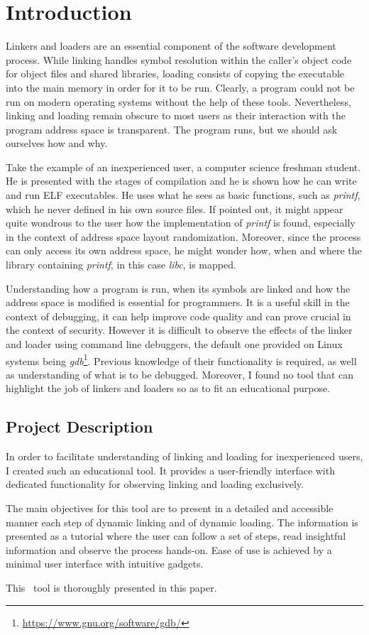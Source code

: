\chapter{Introduction}
\label{chapter:intro}

Linkers and loaders are an essential component of the software development process. While linking handles symbol resolution within the caller’s object code for object files and shared libraries, loading consists of copying the executable into the main memory in order for it to be run. Clearly, a program could not be run on modern operating systems without the help of these tools. Nevertheless, linking and loading remain obscure to most users as their interaction with the program address space is transparent. The program runs, but we should ask ourselves how and why.

Take the example of an inexperienced user, a computer science freshman student. He is presented with the stages of compilation and he is shown how he can write and run ELF executables. He uses what he sees as basic functions, such as \textit{printf}, which he never defined in his own source files. If pointed out, it might appear quite wondrous to the user how the implementation of \textit{printf} is found, especially in the context of address space layout randomization. Moreover, since the process can only access its own address space, he might wonder how, when and where the library containing \textit{printf}, in this case \textit{libc}, is mapped.

Understanding how a program is run, when its symbols are linked and how the address space is modified is essential for programmers. It is a useful skill in the context of debugging, it can help improve code quality and can prove crucial in the context of security. However it is difficult to observe the effects of the linker and loader using command line debuggers, the default one provided on Linux systems being \textit{gdb}\footnote{\url{https://www.gnu.org/software/gdb/}}. Previous knowledge of their functionality is required, as well as understanding of what is to be debugged. Moreover, I found no tool that can highlight the job of linkers and loaders so as to fit an educational purpose.

\section{Project Description}
\label{sec:proj}

In order to facilitate understanding of linking and loading for inexperienced users, I created such an educational tool. It provides a user-friendly interface with dedicated functionality for observing linking and loading exclusively.

The main objectives for this tool are to present in a detailed and accessible manner each step of dynamic linking and of dynamic loading. The information is presented as a tutorial where the user can follow a set of steps, read insightful information and observe the process hands-on. Ease of use is achieved by a minimal user interface with intuitive gadgets.

This \project\ tool is thoroughly presented in this paper.
